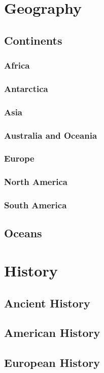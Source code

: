 \documentclass[12pt]{book}
\begin{document}
			
\chapter{Geography}
	\section{Continents}
	\subsection{Africa}
	\subsection{Antarctica}
	\subsection{Asia}
	\subsection{Australia and Oceania}
	\subsection{Europe}
	\subsection{North America}
	\subsection{South America}


	\section{Oceans}

		


\chapter{History}
	\section{Ancient History}
	\section{American History}
	\section{European History}
\end{document}
